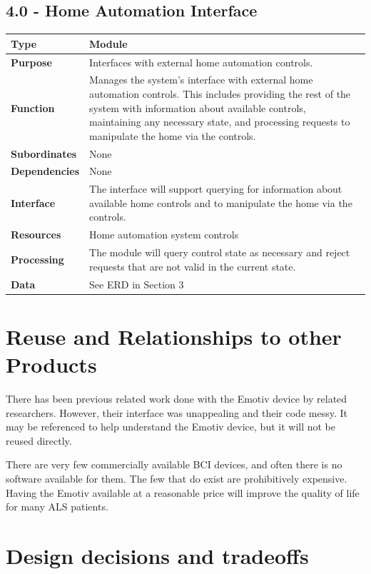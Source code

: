 \documentclass{article}
\begin{document}
\subsection*{4.0 - Home Automation Interface}
\begin{tabular}{ | l |  p{13.3cm} |}
\hline
\textbf{Type} & Module \\ \hline
\textbf{Purpose} & Interfaces with external home automation controls. \\ \hline
\textbf{Function} & Manages the system's interface with external home
automation controls. This includes providing the rest of the system with
information about available controls, maintaining any necessary state, and
processing requests to manipulate the home via the controls. \\ \hline
\textbf{Subordinates} & None \\ \hline
\textbf{Dependencies} & None \\ \hline
\textbf{Interface} & The interface will support querying for information about
available home controls and to manipulate the home via the controls. \\ \hline
\textbf{Resources} & Home automation system controls \\ \hline
\textbf{Processing} & The module will query control state as necessary and
reject requests that are not valid in the current state. \\ \hline
\textbf{Data} & See ERD in Section 3 \\ \hline
\end{tabular}

\newpage

\section{Reuse and Relationships to other Products}
\label{sec:ReuseRel}

There has been previous related work done with the Emotiv device by related
researchers. However, their interface was unappealing and their code messy. It
may be referenced to help understand the Emotiv device, but it will not be
reused directly.

There are very few commercially available BCI devices, and often there is no
software available for them. The few that do exist are prohibitively
expensive. Having the Emotiv available at a reasonable price will improve the
quality of life for many ALS patients.

\section{Design decisions and tradeoffs}
\end{document}
